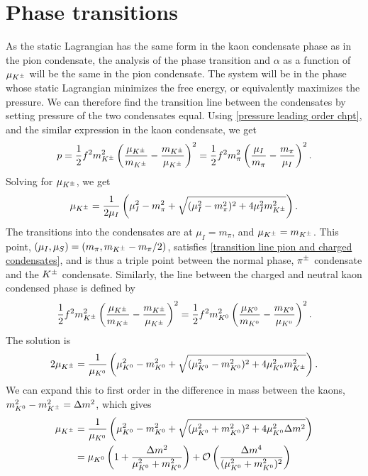 \section{Phase transitions}

As the static Lagrangian has the same form in the kaon condensate phase as in the pion condensate, the analysis of the phase transition and $\alpha$ as a function of $\mu_{K^\pm}$ will be the same in the pion condensate.
The system will be in the phase whose static Lagrangian minimizes the free energy, or equivalently maximizes the pressure.
We can therefore find the transition line between the condensates by setting pressure of the two condensates equal.
Using \autoref{pressure leading order chpt}, and the similar expression in the kaon condensate, we get
%
\begin{equation}
    p 
    = \frac{1}{2} f^2 m_{K^\pm}^2 \left( \frac{\mu_{K^\pm}}{m_{K^\pm}} - \frac{m_{K^\pm}}{\mu_{K^\pm}} \right)^2
    =
    \frac{1}{2} f^2m_\pi^2  \left( \frac{\mu_I}{m_\pi} - \frac{m_\pi}{\mu_I} \right)^2.
\end{equation}
%
Solving for $\mu_{K^\pm}$, we get
%
\begin{equation}
    \label{transition line pion and charged condensates}
    \mu_{K^\pm} =\frac{1}{2\mu_I} \left(\mu_I^2 - m_\pi^2  + \sqrt{(\mu_I^2 - m_\pi^2)^2 + 4\mu_I^2 m_{K^\pm}^2}\right).
\end{equation}
%
The transitions into the condensates are at $\mu_I = m_\pi$, and $\mu_{K^\pm} = m_{K^\pm}$.
This point, $(\mu_I, \mu_S) = (m_\pi, m_{K^\pm} - m_\pi/2)$, satisfies \autoref{transition line pion and charged condensates}, and is thus a triple point between the normal phase, ${\pi^\pm}$ condensate and the ${K^\pm}$ condensate. 
Similarly, the line between the charged and neutral kaon condensed phase is defined by
%
\begin{equation}
    \frac{1}{2} f^2 m_{K^\pm}^2 \left( \frac{\mu_{K^\pm}}{m_{K^\pm}} - \frac{m_{K^\pm}}{\mu_{K^\pm}} \right)^2
    =
    \frac{1}{2} f^2 m_{K^0}^2 \left( \frac{\mu_{K^0}}{m_{K^0}} - \frac{m_{K^0}}{\mu_{K^0}} \right)^2.
\end{equation}
%
The solution is
%
\begin{equation}
    2 \mu_{K^\pm} 
    = \frac{1}{\mu_{K^0}}
    \left(
        \mu_{K^0}^2 - m_{K^0}^2  + \sqrt{(\mu_{K^0}^2 - m_{K^0}^2)^2 + 4\mu_{K^0}^2m_{K^\pm}^2}
    \right).
\end{equation}
%
We can expand this to first order in the difference in mass between the kaons, $m_{K^0}^2 - m_{K^\pm}^2 = \Delta m^2$, which gives
%
\begin{align}
    \nonumber
    \mu_{K^\pm}
    &= \frac{1}{\mu_{K^0}} 
    \left(
        \mu_{K^0}^2 - m_{K^0}^2 + \sqrt{(\mu_{K^0}^2 + m_{K^0}^2)^2 + 4\mu_{K^0}^2 \Delta m^2}
    \right)\\
    &= \mu_{K^0} \left(1 + \frac{\Delta m^2}{\mu_{K^0}^2 + m_{K^0}^2}\right)
    + \mathcal O\left( \frac{\Delta m^4}{ (\mu_{K^0}^2 + m_{K^0}^2)^2} \right)
\end{align}
